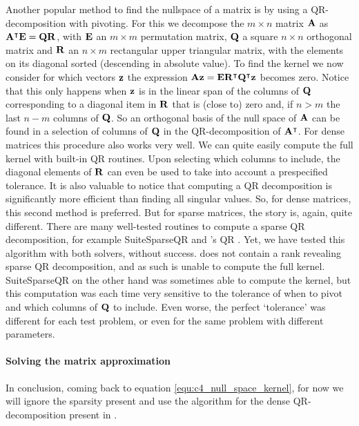 Another popular \cite{trefethen_numerical_1997} method to find the nullspace of a matrix is by using a QR-decomposition with pivoting. For this we decompose the $m \times n$ matrix $\vb{A}$ as ${\vb{A}}^\intercal\vb{E} = \vb{Q} \vb{R}$, with $\vb{E}$ an $m\times m$ permutation matrix, $\vb{Q}$ a square $n \times n$ orthogonal matrix and $\vb{R}$ an $n \times m$ rectangular upper triangular matrix, with the elements on its diagonal sorted (descending in absolute value). To find the kernel we now consider for which vectors $\vb{z}$ the expression $\vb{A} \vb{z} = \vb{E}{\vb{R}}^\intercal{\vb{Q}}^\intercal\vb{z}$ becomes zero. Notice that this only happens when $\vb{z}$ is in the linear span of the columns of $\vb{Q}$ corresponding to a diagonal item in $\vb{R}$ that is (close to) zero and, if $n > m$ the last $n - m$ columns of $\vb{Q}$. So an orthogonal basis of the null space of $\vb{A}$ can be found in a selection of columns of $\vb{Q}$ in the QR-decomposition of ${\vb{A}}^\intercal$. For dense matrices this procedure also works very well. We can quite easily compute the full kernel with built-in QR routines. Upon selecting which columns to include, the diagonal elements of $\vb{R}$ can even be used to take into account a prespecified tolerance. It is also valuable to notice that computing a QR decomposition is significantly more efficient than finding all singular values. So, for dense matrices, this second method is preferred. But for sparse matrices, the story is, again, quite different. There are many well-tested routines to compute a sparse QR decomposition, for example SuiteSparseQR \cite{davis_algorithm_2011} and \Eigen{}'s QR \cite{guennebaud_eigen_2010}. Yet, we have tested this algorithm with both solvers, without success. \Eigen{} does not contain a rank revealing sparse QR decomposition, and as such is unable to compute the full kernel. SuiteSparseQR on the other hand was sometimes able to compute the kernel, but this computation was each time very sensitive to the tolerance of when to pivot and which columns of $\vb{Q}$ to include. Even worse, the perfect `tolerance' was different for each test problem, or even for the same problem with different parameters.

\paragraph{Solving the matrix approximation}
In conclusion, coming back to equation \eqref{equ:c4_null_space_kernel}, for now we will ignore the sparsity present and use the algorithm for the dense QR-decomposition present in \Eigen{} \cite{guennebaud_eigen_2010}.

